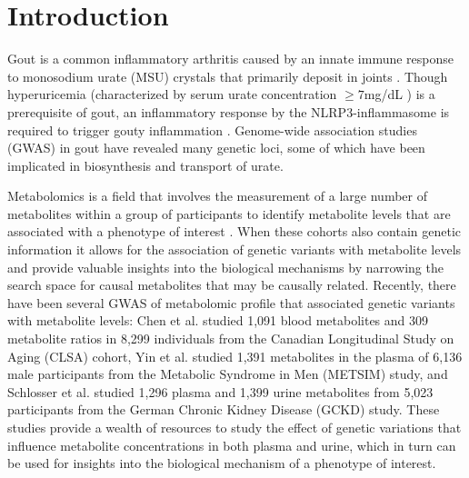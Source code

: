 \documentclass[gucdd,article,submit,pdftex,moreauthors]{Definitions/mdpi}
\begin{document}
\section{Introduction}

Gout is a common inflammatory arthritis caused by an innate immune response to monosodium urate (MSU) crystals that primarily deposit in joints \cite{dalbeth_gout_2021}.
Though hyperuricemia (characterized by serum urate concentration $\ge7$mg/dL \citep{dalbeth_gout_2021}) is a prerequisite of gout, an inflammatory response by the NLRP3-inflammasome is required to trigger gouty inflammation \citep{dalbeth_gout_2021,martinon_gout-associated_2006}.
Genome-wide association studies (GWAS) in gout \citep{tin_target_2019,major_genome-wide_2024,li_replication_2017,nakayama_subtype-specific_2020,kawamura_genome-wide_2019,zhou_global_2022} have revealed many genetic loci, some of which have been implicated in biosynthesis and transport of urate.

Metabolomics is a field that involves the measurement of a large number of metabolites within a group of participants to identify metabolite levels that are associated with a phenotype of interest \citep{johnson_metabolomics_2016,li_metabolomics_2023}.
When these cohorts also contain genetic information it allows for the association of genetic variants with metabolite levels \citep{chen_genomic_2023,schlosser_genetic_2023,yin_genome-wide_2022} and provide valuable insights into the biological mechanisms by narrowing the search space for causal metabolites that may be causally related.
Recently, there have been several GWAS of metabolomic profile that associated genetic variants with metabolite levels: Chen et al. \citep{chen_genomic_2023} studied 1,091 blood metabolites and 309 metabolite ratios in 8,299 individuals from the Canadian Longitudinal Study on Aging (CLSA) cohort, Yin et al. \citep{yin_genome-wide_2022} studied 1,391 metabolites in the plasma of 6,136 male participants from the Metabolic Syndrome in Men (METSIM) study, and Schlosser et al. \citep{schlosser_genetic_2023} studied 1,296 plasma and 1,399 urine metabolites from 5,023 participants from the German Chronic Kidney Disease (GCKD) study.
These studies provide a wealth of resources to study the effect of genetic variations that influence metabolite concentrations in both plasma and urine, which in turn can be used for insights into the biological mechanism of a phenotype of interest.
\end{document}
